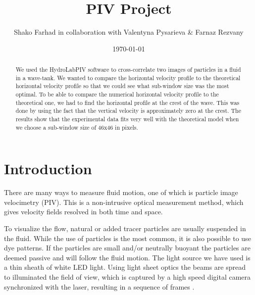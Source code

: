 \documentclass[english,a4paper,12pt]{article}
\title{PIV Project}
\author{Shako Farhad in collaboration with Valentyna Pysarieva \& Farnaz Rezvany}
\date{\today}
\begin{document}
 
 
\lstset{style=mystyle}

\maketitle

\begin{abstract}
We used the HydroLabPIV software to cross-correlate two images of particles in a fluid in a wave-tank. We wanted to compare the horizontal velocity profile to the theoretical horizontal velocity profile so that we could see what sub-window size was the most optimal. To be able to compare the numerical horizontal velocity profile to the theoretical one, we had to find the horizontal profile at the crest of the wave. This was done by using the fact that the vertical velocity is approximately zero at the crest. The results show that the experimental data fits very well with the theoretical model when we choose a sub-window size of 46x46 in pixels.
\end{abstract}

\section*{Introduction}
There are many ways to measure fluid motion, one of which is particle image velocimetry (PIV). This is a
non-intrusive optical measurement method, which gives velocity fields resolved in both time and space. \\ \bigskip

To visualize the flow, natural or added tracer particles are usually suspended in the fluid. While the use of particles is the most common, it is also possible to use dye patterns. If the particles are small and/or neutrally buoyant the particles are deemed passive and will follow the fluid motion. The light source we have used is a thin sheath of white LED light. Using light sheet optics the beams are spread to illuminated the field of view, which is captured by a high speed digital camera synchronized with the laser, resulting in a sequence of frames {\cite{HLPIV}}. \\ \bigskip
\end{document}
